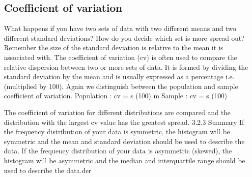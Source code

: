 \subsection{ Coefficient of variation}
What happens if you have two sets of data with two different means and two different standard deviations? How do you decide which set is more spread out? Remember the size of the standard deviation is relative to the mean it is associated with.
The coefficient of variation (cv) is often used to compare the relative dispersion between two or more sets of data. It is formed by dividing the standard deviation by the mean and is usually expressed as a percentage i.e. (multiplied by 100). Again we distinguish between the population and sample coefficient of variation.
Population  :  cv  =   s (100)
m
Sample        : cv  =    s (100)            


The coefficient of variation for different distributions are compared and the distribution with the largest cv value has the greatest spread.
3.2.3 Summary
If the frequency distribution of your data is symmetric, the histogram will be symmetric and the mean and standard deviation should be used to describe the data.
If the frequency distribution of your data is asymmetric (skewed), the histogram will be asymmetric and the median and interquartile range should be used to describe the data.der

